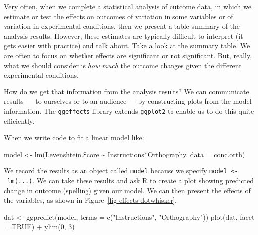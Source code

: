 \documentclass[
  letterpaper,
  DIV=11,
  numbers=noendperiod]{scrreprt}
\newenvironment{Shaded}{\begin{snugshade}}{\end{snugshade}}
\newcommand{\AttributeTok}[1]{\textcolor[rgb]{0.40,0.45,0.13}{#1}}
\newcommand{\ConstantTok}[1]{\textcolor[rgb]{0.56,0.35,0.01}{#1}}
\newcommand{\DecValTok}[1]{\textcolor[rgb]{0.68,0.00,0.00}{#1}}
\newcommand{\FunctionTok}[1]{\textcolor[rgb]{0.28,0.35,0.67}{#1}}
\newcommand{\NormalTok}[1]{\textcolor[rgb]{0.00,0.23,0.31}{#1}}
\newcommand{\OtherTok}[1]{\textcolor[rgb]{0.00,0.23,0.31}{#1}}
\newcommand{\SpecialCharTok}[1]{\textcolor[rgb]{0.37,0.37,0.37}{#1}}
\newcommand{\StringTok}[1]{\textcolor[rgb]{0.13,0.47,0.30}{#1}}
\begin{document}
Very often, when we complete a statistical analysis of outcome data, in
which we estimate or test the effects on outcomes of variation in some
variables or of variation in experimental conditions, then we present a
table summary of the analysis results. However, these estimates are
typically difficult to interpret (it gets easier with practice) and talk
about. Take a look at the summary table. We are often to focus on
whether effects are significant or not significant. But, really, what we
should consider is \emph{how much} the outcome changes given the
different experimental conditions.

How do we get that information from the analysis results? We can
communicate results --- to ourselves or to an audience --- by
constructing plots from the model information. The \texttt{ggeffects}
library extends \texttt{ggplot2} to enable us to do this quite
efficiently.

When we write code to fit a linear model like:

\begin{Shaded}
\begin{Highlighting}[]
\NormalTok{model }\OtherTok{\textless{}{-}} \FunctionTok{lm}\NormalTok{(Levenshtein.Score }\SpecialCharTok{\textasciitilde{}}\NormalTok{ Instructions}\SpecialCharTok{*}\NormalTok{Orthography, }\AttributeTok{data =}\NormalTok{ conc.orth)}
\end{Highlighting}
\end{Shaded}

We record the results as an object called \texttt{model} because we
specify \texttt{model\ \textless{}-\ lm(...)}. We can take these results
and ask R to create a plot showing predicted change in outcome
(spelling) given our model. We can then present the effects of the
variables, as shown in Figure~\ref{fig-effects-dotwhisker}.

\begin{Shaded}
\begin{Highlighting}[numbers=left,,]
\NormalTok{dat }\OtherTok{\textless{}{-}} \FunctionTok{ggpredict}\NormalTok{(model, }\AttributeTok{terms =} \FunctionTok{c}\NormalTok{(}\StringTok{"Instructions"}\NormalTok{, }\StringTok{"Orthography"}\NormalTok{))}
\FunctionTok{plot}\NormalTok{(dat, }\AttributeTok{facet =} \ConstantTok{TRUE}\NormalTok{) }\SpecialCharTok{+} \FunctionTok{ylim}\NormalTok{(}\DecValTok{0}\NormalTok{, }\DecValTok{3}\NormalTok{)}
\end{Highlighting}
\end{Shaded}
\end{document}
